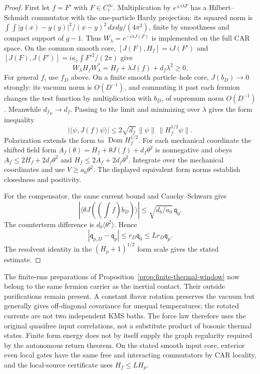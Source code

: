 \begin{proof}
First let $f=F'$ with $F\in C_c^\infty$.
Multiplication by $e^{\pm i\lambda F}$ has a Hilbert--Schmidt
commutator with the one-particle Hardy projection: its squared norm
is $\int\!\int|g(x)-g(y)|^2/(x-y)^2\,dxdy/(4\pi^2)$,
finite by smoothness and compact support of $g-1$.
Thus $W_\lambda=e^{-i\lambda J(F)}$ is implemented on the full CAR
space. On the common smooth core,
$[J(F),H_f]=iJ(F')$ and
$[J(F),J(F')]=i\kappa_c\int F'^2/(2\pi)$ give
\[
 W_\lambda H_f W_\lambda^*
       =H_f+\lambda J(f)+d_f\lambda^2\ge0.
\]
For general $f$, use $f_D$ above. On a finite smooth particle--hole
core, $J(b_D)\to0$ strongly: its vacuum norm is $O(D^{-1})$,
and commuting it past each fermion changes the test function by
multiplication with $b_D$, of supremum norm $O(D^{-1})$.
Meanwhile $d_{f_D}\to d_f$. Passing to the limit and minimizing
over $\lambda$ gives the form inequality
\[
 |\langle\psi,J(f)\psi\rangle|
       \le2\sqrt{d_f}\,\|\psi\|\,\|H_f^{1/2}\psi\|.
\]
Polarization extends the form to $\operatorname{Dom}H_f^{1/2}$.
For each mechanical coordinate the shifted field form
$A_f(\theta)=H_f+\theta J(f)+d_f\theta^2$ is nonnegative and
obeys $A_f\le2H_f+2d_f\theta^2$ and
$H_f\le2A_f+2d_f\theta^2$.
Integrate over the mechanical coordinates and use $V\ge a_0\theta^2$.
The displayed equivalent form norms establish closedness and
positivity.

For the compensator, the same current bound and Cauchy--Schwarz give
\[
 |\langle\theta J((\int f)b_D)\rangle|
       \le\sqrt{d_b/a_0}\,\mathfrak q_0.
\]
The counterterm difference is $d_b\langle\theta^2\rangle$.
Hence
\[
 |\mathfrak q_{p,D}-\mathfrak q_p|\le r_D\mathfrak q_0
       \le Lr_D\mathfrak q_p.
\]
The resolvent identity in the
$(H_p+1)^{1/2}$ form scale gives the stated estimate.
\end{proof}

The finite-rms preparations of
Proposition~\ref{prop:finite-thermal-window} now belong to the same
fermion carrier as the inertial contact. Their outside purifications
remain present. A constant flavor rotation preserves the vacuum but
generally gives off-diagonal covariance for unequal temperatures;
the rotated currents are not two independent KMS baths. The force
law therefore uses the original quasifree input correlations, not
a substitute product of bosonic thermal states. Finite form energy
does not by itself supply the graph regularity required by the
autonomous return theorem. On the stated smooth input core, exterior
even local gates have the same free and interacting commutators by
CAR locality, and the local-source certificate uses $H_f\le LH_p$.

